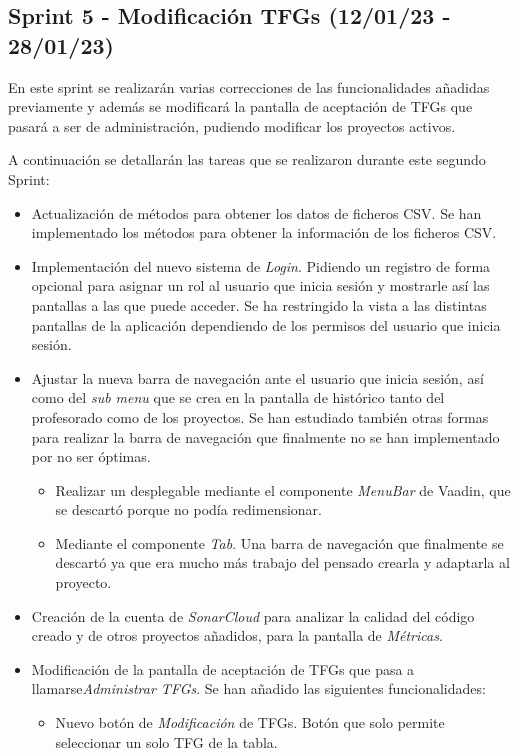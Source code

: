 \subsection{Sprint 5 - Modificación TFGs (12/01/23 - 28/01/23) }

En este sprint se realizarán varias correcciones de las funcionalidades añadidas previamente y además se modificará la pantalla de aceptación de TFGs que pasará a ser de administración, pudiendo modificar los proyectos activos.

A continuación se detallarán las tareas que se realizaron durante este segundo Sprint:

\begin{itemize}
	\item Actualización de métodos para obtener los datos de ficheros CSV. Se han implementado los métodos para obtener la información de los ficheros CSV.
	\item Implementación del nuevo sistema de \emph{Login}. Pidiendo un registro de forma opcional para asignar un rol al usuario que inicia sesión y mostrarle así las pantallas a las que puede acceder. Se ha restringido la vista a las distintas pantallas de la aplicación dependiendo de los permisos del usuario que inicia sesión.
	\item Ajustar la nueva barra de navegación ante el usuario que inicia sesión, así como del \emph{sub menu} que se crea en la pantalla de histórico tanto del profesorado como de los proyectos. Se han estudiado también otras formas para realizar la barra de navegación que finalmente no se han implementado por no ser óptimas.
	\begin{itemize}
		\item Realizar un desplegable mediante el componente \emph{MenuBar} de Vaadin, que se descartó porque no podía redimensionar.
		\item Mediante el componente \emph{Tab}. Una barra de navegación que finalmente se descartó ya que era mucho más trabajo del pensado crearla y adaptarla al proyecto.
	\end{itemize}		
	\item Creación de la cuenta de \emph{SonarCloud} para analizar la calidad del código creado y de otros proyectos añadidos, para la pantalla de \emph{Métricas}.
	\item Modificación de la pantalla de aceptación de TFGs que pasa a llamarse\emph{Administrar TFGs}. Se han añadido las siguientes funcionalidades:
	\begin{itemize}
		\item Nuevo botón de \emph{Modificación} de TFGs. Botón que solo permite seleccionar un solo TFG de la tabla.

\end{itemize}
\end{itemize}

